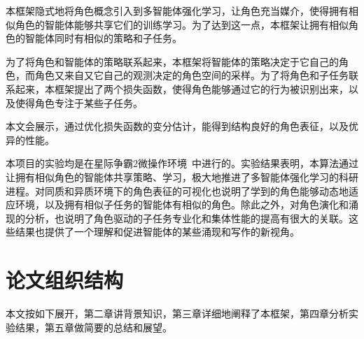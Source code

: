 本框架隐式地将角色概念引入到多智能体强化学习，让角色充当媒介，使得拥有相似角色的智能体能够共享它们的训练学习。为了达到这一点，本框架让拥有相似角色的智能体同时有相似的策略和子任务。

为了将角色和智能体的策略联系起来，本框架将智能体的策略决定于它自己的角色，而角色又来自又它自己的观测决定的角色空间的采样。为了将角色和子任务联系起来，本框架提出了两个损失函数，使得角色能够通过它的行为被识别出来，以及使得角色专注于某些子任务。

本文会展示，通过优化损失函数的变分估计，能得到结构良好的角色表征，以及优异的性能。

本项目的实验均是在星际争霸2微操作环境~\cite{vinyals2017starcraft, samvelyan2019starcraft}中进行的。实验结果表明，本算法通过让拥有相似角色的智能体共享策略、学习，极大地推进了多智能体强化学习的科研进程。对同质和异质环境下的角色表征的可视化也说明了学到的角色能够动态地适应环境，以及拥有相似子任务的智能体有相似的角色。除此之外，对角色演化和涌现的分析，也说明了角色驱动的子任务专业化和集体性能的提高有很大的关联。这些结果也提供了一个理解和促进智能体的某些涌现和写作的新视角。

\section{论文组织结构}
本文按如下展开，第二章讲背景知识，第三章详细地阐释了本框架，第四章分析实验结果，第五章做简要的总结和展望。
